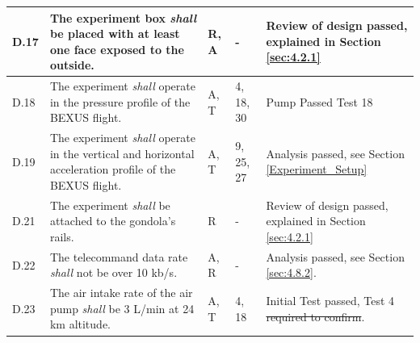 \documentclass[a4paper,12pt,twoside]{article}
\providecommand{\DIFaddtex}[1]{{\protect\color{blue}\uwave{#1}}} %
\providecommand{\DIFdeltex}[1]{{\protect\color{red}\sout{#1}}}                      %
\providecommand{\DIFaddbegin}{} %
\providecommand{\DIFaddend}{} %
\providecommand{\DIFdelbegin}{} %
\providecommand{\DIFdelend}{} %
\providecommand{\DIFadd}[1]{\texorpdfstring{\DIFaddtex{#1}}{#1}} %
\providecommand{\DIFdel}[1]{\texorpdfstring{\DIFdeltex{#1}}{}} %
\newcommand{\DIFscaledelfig}{0.5}
\newlength{\DIFdelgraphicswidth} %
\newlength{\DIFdelgraphicsheight} %
\newcommand{\DIFaddincludegraphics}[2][]{{\color{blue}\fbox{\DIFOincludegraphics[#1]{#2}}}} %
\newcommand{\DIFdelincludegraphics}[2][]{%
\sbox{\DIFdelgraphicsbox}{\DIFOincludegraphics[#1]{#2}}%
\settoboxwidth{\DIFdelgraphicswidth}{\DIFdelgraphicsbox} %
\settoboxtotalheight{\DIFdelgraphicsheight}{\DIFdelgraphicsbox} %
\scalebox{\DIFscaledelfig}{%
\parbox[b]{\DIFdelgraphicswidth}{\usebox{\DIFdelgraphicsbox}\\[-\baselineskip] \rule{\DIFdelgraphicswidth}{0em}}\llap{\resizebox{\DIFdelgraphicswidth}{\DIFdelgraphicsheight}{%
\setlength{\unitlength}{\DIFdelgraphicswidth}%
\begin{picture}(1,1)%
\thicklines\linethickness{2pt} %
{\color[rgb]{1,0,0}\put(0,0){\framebox(1,1){}}}%
{\color[rgb]{1,0,0}\put(0,0){\line( 1,1){1}}}%
{\color[rgb]{1,0,0}\put(0,1){\line(1,-1){1}}}%
\end{picture}%
}\hspace*{3pt}}} %
} %
\DeclareRobustCommand{\DIFaddbegin}{\DIFOaddbegin \let\includegraphics\DIFaddincludegraphics} %
\DeclareRobustCommand{\DIFaddend}{\DIFOaddend \let\includegraphics\DIFOincludegraphics} %
\DeclareRobustCommand{\DIFdelbegin}{\DIFOdelbegin \let\includegraphics\DIFdelincludegraphics} %
\DeclareRobustCommand{\DIFdelend}{\DIFOaddend \let\includegraphics\DIFOincludegraphics} %
\begin{document}
\begin{longtable}[]{|m{}| m{} |m{} |m{}|m{}|}
D.17 & The experiment box \textit{shall} be placed with at least one face exposed to the outside.                                                                                &     R, A         & -            &   Review of design passed, explained in Section \ref{sec:4.2.1}     
\\ \hline
D.18 & The  experiment \textit{shall} operate  in  the  pressure  profile  of  the BEXUS flight.\cite{BexusManual}                                                                              &    A, T         & 4, 18, 30 &  Pump Passed Test 18\DIFaddbegin \DIFadd{, further testing ongoing     
}\DIFaddend \\ \hline
D.19 & The  experiment \textit{shall} operate  in  the  vertical  and  horizontal  acceleration  profile  of  the BEXUS flight.\cite{BexusManual}                                                                              &    A, T         & 9, 25, 27            &   Analysis passed, see Section \ref{Experiment_Setup}    
\\ \hline
D.21 & The experiment \textit{shall} be attached to the gondola’s rails.                                                                                &     R         & -            &  Review of design passed, explained in Section \ref{sec:4.2.1}     
\\ \hline
D.22 & The telecommand data rate \textit{shall} not be over 10 kb/s.                                                                               &     A, R         & -            &    Analysis passed, see Section \ref{sec:4.8.2}.   
\\  \hline

D.23 & The air intake rate of the air pump \textit{shall} be 3 L/min at 24 km altitude.                                                                                                                        &       A, T        & 4, 18            &  Initial Test passed, Test 4 \DIFdelbegin \DIFdel{required to confirm}\DIFdelend \DIFaddbegin \DIFadd{ongoing}\DIFaddend .      \\ \hline


\end{longtable}
\end{document}
